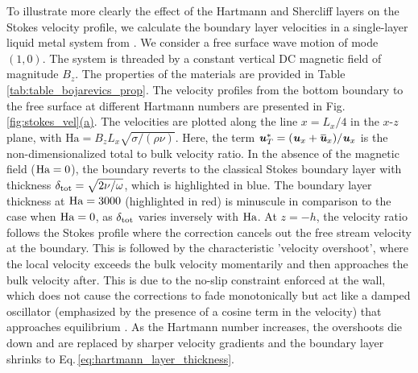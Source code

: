 \documentclass[aps,prfluids,reprint,superscriptaddress]{revtex4-2}
\newcommand{\h}[1]{\textbf{\textit{#1}}}
\newcommand{\ii}[1]{\text{#1}}
\newcommand{\overbar}[1]{\mkern 1.5mu\overline{\mkern-2mu#1\mkern-2mu}\mkern 1.5mu}
\newcommand{\subref}[2]{\ref{#1}\hyperref[#1]{(#2)}}
\begin{document}
\indent To illustrate more clearly the effect of the Hartmann and Shercliff layers on the Stokes velocity profile, we calculate the boundary layer velocities in a single-layer liquid metal system from \citet{Bojarevics2006a}. We consider a free surface wave motion of mode $(1,0)$. The system is threaded by a constant vertical DC magnetic field of magnitude $B_z$. The properties of the materials are provided in Table\,\ref{tab:table_bojarevics_prop}. The velocity profiles from the bottom boundary to the free surface at different Hartmann numbers are presented in Fig.\,\subref{fig:stokes_vel}{a}. The velocities are plotted along the line $x=L_x/4$ in the $x$-$z$ plane, with $\ii{Ha} = B_zL_x\sqrt{\sigma/(\rho\nu)}$. Here, the term $\h u^*_{T} = ({\h u}_{x} + {\overbar{\h u}}_{x})/{\h u}_{x}$ is the non-dimensionalized total to bulk velocity ratio.  In the absence of the magnetic field ($\rm Ha=0$), the boundary reverts to the classical Stokes boundary layer with thickness $\delta_{\rm tot} = \sqrt{2\nu/\omega}$, which is highlighted in blue. The boundary layer thickness at $\rm Ha = 3000$ (highlighted in red) is minuscule in comparison to the case when $\rm Ha = 0$, as $\delta_{\rm tot}$ varies inversely with $\rm Ha$. At $z=-h$, the velocity ratio follows the Stokes profile where the correction cancels out the free stream velocity at the boundary. This is followed by the characteristic 'velocity overshoot', where the local velocity exceeds the bulk velocity momentarily and then approaches the bulk velocity after. This is due to the no-slip constraint enforced at the wall, which does not cause the corrections to fade monotonically but act like a damped oscillator (emphasized by the presence of a cosine term in the velocity) that approaches equilibrium \cite{Schlichting2016}. As the Hartmann number increases, the overshoots die down and are replaced by sharper velocity gradients and the boundary layer shrinks to Eq.\,\eqref{eq:hartmann_layer_thickness}. 
\end{document}
